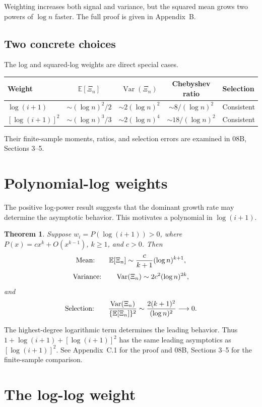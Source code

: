 \documentclass[11pt]{article}
\newtheorem{theorem}{Theorem}[section]
\begin{document}
Weighting increases both signal and variance, but the squared mean grows two
powers of $\log n$ faster.  The full proof is given in Appendix~B.

\subsection{Two concrete choices}

The log and squared-log weights are direct special cases.
\begin{center}
\begin{tabular}{@{}lcccl@{}}
\toprule
Weight & $\mathbb E[\Xi_n]$ & $\operatorname{Var}(\Xi_n)$
& Chebyshev ratio & Selection \\
\midrule
$\log(i+1)$ & $\sim(\log n)^2/2$ & $\sim2(\log n)^2$
& $\sim8/(\log n)^2$ & Consistent \\
$[\log(i+1)]^2$ & $\sim(\log n)^3/3$ & $\sim2(\log n)^4$
& $\sim18/(\log n)^2$ & Consistent \\
\bottomrule
\end{tabular}
\end{center}
Their finite-sample moments, ratios, and selection errors are examined in
08B, Sections 3--5.

\section{Polynomial-log weights}

The positive log-power result suggests that the dominant growth rate may
determine the asymptotic behavior.  This motivates a polynomial in
$\log(i+1)$.

\begin{theorem}\label{thm:poly}
Suppose $w_i=P(\log(i+1))>0$, where
$P(x)=cx^k+O(x^{k-1})$, $k\geq1$, and $c>0$.  Then
\[
\textnormal{Mean:}\qquad
\mathbb E[\Xi_n]\sim\frac{c}{k+1}(\log n)^{k+1},
\]
\[
\textnormal{Variance:}\qquad
\operatorname{Var}(\Xi_n)\sim2c^2(\log n)^{2k},
\]
and
\[
\textnormal{Selection:}\qquad
\frac{\operatorname{Var}(\Xi_n)}{\{\mathbb E[\Xi_n]\}^2}
\sim\frac{2(k+1)^2}{(\log n)^2}\longrightarrow0.
\]
\end{theorem}

The highest-degree logarithmic term determines the leading behavior.  Thus
$1+\log(i+1)+[\log(i+1)]^2$ has the same leading asymptotics as
$[\log(i+1)]^2$.  See Appendix~C.1 for the proof and 08B, Sections 3--5 for
the finite-sample comparison.

\section{The log-log weight}
\end{document}
